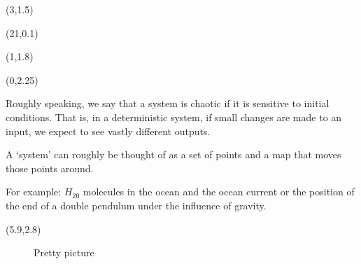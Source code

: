 \documentclass[a0,landscape]{a0poster}  %
\theoremstyle{plain}
\def\Hugehead#1{\noindent{\Huge\color{Saphire} #1}}
\begin{document}

\begin{textblock}{2}(3,1.5)

\end{textblock}

\begin{textblock}{1.8}(21,0.1)
\end{textblock}

\begin{textblock}{7}(1,1.8)
\Hugehead{What is Chaos?} %
\nocite{*}
\end{textblock}

\begin{textblock}{5.5}(0,2.25)
\Large{Roughly speaking, we say that a system is chaotic if it is sensitive to initial conditions. That is, in a deterministic
system, if small changes are made to an input, we expect to see vastly different outputs.

A `system' can roughly be thought of as a set of points and a map that moves those points around. 

For example: $H_20$ molecules in the ocean and the ocean current or the position of the end of a double pendulum under
the influence of gravity. 
}\end{textblock}

\begin{textblock}{2}(5.9,2.8)
\begin{figure}
\vspace{-3 mm}
\hspace{8mm}


\vspace{0 mm}
\caption{Pretty picture}
\end{figure}
\end{textblock}
\end{document}
